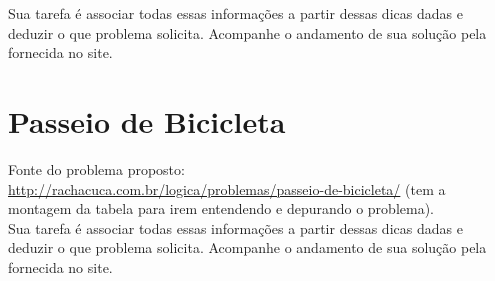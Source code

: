 \documentclass[a4paper,12pt]{article}
\begin{document}
\vspace{1.5cm}
 Sua tarefa é associar todas essas informações a partir dessas dicas dadas e deduzir o que problema solicita. Acompanhe o andamento de sua solução pela fornecida no site.
\newpage
\section{Passeio de Bicicleta}

 Fonte do problema proposto:\\
 \url{http://rachacuca.com.br/logica/problemas/passeio-de-bicicleta/}
 (tem a montagem da tabela para irem entendendo e depurando o problema).\\

\vspace{1.5cm}
 Sua tarefa é associar todas essas informações a partir dessas dicas dadas e deduzir o que problema solicita. Acompanhe o andamento de sua solução pela fornecida no site.
\end{document}
